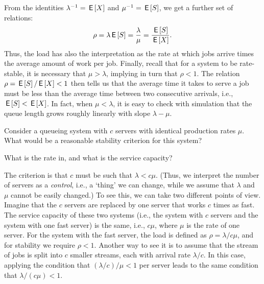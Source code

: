 From the identities $\lambda^{-1} = \,\mathsf{E}\left[X\right]$ and $\mu^{-1} = \,\mathsf{E}\left[S\right]$, we get
a further set of relations:
\begin{equation*}
 \rho = \lambda \,\mathsf{E}\left[S\right] = \frac{\lambda}{\mu} = \frac{\,\mathsf{E}\left[S\right]}{\,\mathsf{E}\left[X\right]}.
\end{equation*}
Thus, the load has also the interpretation as the rate at which jobs
arrive times the average amount of work per job. Finally,
recall that for a system to be rate-stable, it is necessary that
$\mu> \lambda$, implying in turn that $\rho < 1$. The relation
$\rho=\,\mathsf{E}\left[S\right]/ \,\mathsf{E}\left[X\right] < 1$ then tells us that the average time it takes to
serve a job must be less than the average time between two consecutive
arrivals, i.e., $\,\mathsf{E}\left[S\right] < \,\mathsf{E}\left[X\right]$. In fact, when $\mu < \lambda$, it is easy to check with simulation that the queue length
grows roughly linearly with slope $\lambda - \mu$.


\begin{exercise}
 Consider a queueing system with $c$ servers with identical production rates $\mu$.
 What would be a reasonable stability criterion for this system?
\begin{hint}
What is the rate in, and what is the service capacity?
\end{hint}
\begin{solution}
 The criterion is that $c$ must be such that $\lambda < c\mu$.
 (Thus, we interpret the number of servers as a \emph{control}, i.e., a `thing' we can change, while we assume that $\lambda$ and $\mu$ cannot be easily changed.)
 To see this, we can take two different points of view.
 Imagine that the $c$ servers are replaced by one server that works $c$ times as fast.
 The service capacity of these two systems (i.e., the system with $c$ servers and the system with one fast server) is the same, i.e., $c\mu$, where $\mu$ is the rate of one server.
 For the system with the fast server, the load is defined as $\rho =\lambda/c\mu$, and for stability we require $\rho<1$.
 Another way to see it is to assume that the stream of jobs is split into $c$ smaller streams, each with arrival rate $\lambda/c$.
 In this case, applying the condition that $(\lambda/c )/\mu<1$ per server leads to the same condition that $\lambda/(c\mu) < 1$.
\end{solution}
\end{exercise}





